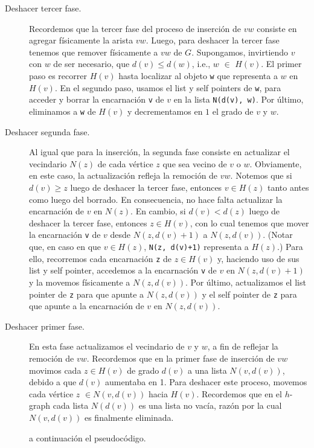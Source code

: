 \documentclass[a4paper,12pt]{article}
\makeatletter
\newcommand{\Code}[1]{\lstinline[basicstyle={\tt}]@#1@}
\makeatother
\begin{document}
\begin{description}
\item[Deshacer tercer fase.] Recordemos que la tercer fase del proceso de inserción de $vw$ consiste en agregar físicamente la arista $vw$.  Luego, para deshacer la tercer fase tenemos que remover físicamente a $vw$ de $G$.  Supongamos, invirtiendo $v$ con $w$ de ser necesario, que $d(v) \leq d(w)$, i.e., $w$ ${\in}$ $H(v)$.  El primer paso es recorrer $H(v)$ hasta localizar al objeto \texttt{w} que representa a $w$ en $H(v)$.  En el segundo paso, usamos el list y self pointers de \texttt{w}, para acceder y borrar la encarnación \texttt{v} de $v$ en la lista \Code{N(d(v), w)}.  Por último, eliminamos a \texttt{w} de $H(v)$ y decrementamos en $1$ el grado de $v$ y $w$.

\item[Deshacer segunda fase.] Al igual que para la inserción, la segunda fase consiste en actualizar el vecindario $N(z)$ de cada vértice $z$ que sea vecino de $v$ o $w$.  Obviamente, en este caso, la actualización refleja la remoción de $vw$.  Notemos que si $d(v) \geq z$ luego de deshacer la tercer fase, entonces $v \in H(z)$ tanto antes como luego del borrado.  En consecuencia, no hace falta actualizar la encarnación de $v$ en $N(z)$.  En cambio, si $d(v) < d(z)$ luego de deshacer la tercer fase, entonces $z \in H(v)$, con lo cual tenemos que mover la encarnación \Code{v} de $v$ desde $N(z,d(v)+1)$ a $N(z, d(v))$.  (Notar que, en caso en que $v \in H(z)$, \Code{N(z, d(v)+1)} representa a $H(z)$.)  Para ello, recorremos cada encarnación \Code{z} de $z \in H(v)$ y, haciendo uso de sus list y self pointer, accedemos a la encarnación \Code{v} de $v$ en $N(z,d(v)+1)$ y la movemos físicamente a $N(z,d(v))$.  Por último, actualizamos el list pointer de \Code{z} para que apunte a $N(z,d(v))$ y el self pointer de \Code{z} para que apunte a la encarnación de $v$ en $N(z,d(v))$.

\item[Deshacer primer fase.] En esta fase actualizamos el vecindario de $v$ y $w$, a fin de reflejar la remoción de $vw$.  Recordemos que en la primer fase de inserción de $vw$ movimos cada $z \in H(v)$  de grado $d(v)$ a una lista $N(v,d(v))$, debido a que $d(v)$ aumentaba en 1. Para deshacer este proceso, movemos cada vértice $z$ $\in N(v,d(v))$  hacia $H(v)$. Recordemos que en el $h$-graph cada lista $N(d(v))$ es una lista no vacía, razón por la cual $N(v,d(v))$ es finalmente eliminada.

a continuación el pseudocódigo.
\end{description}
\end{document}
